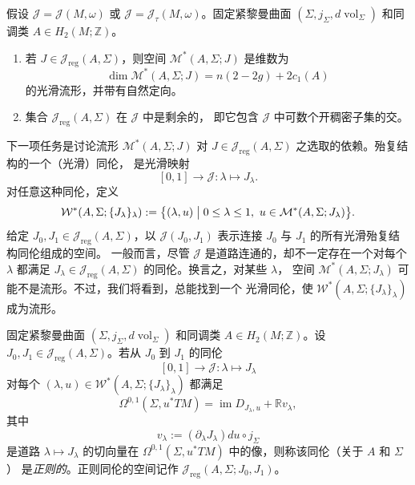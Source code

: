 \begin{theorem}\label{thm:3-1-6}
假设 $\mathcal J=\mathcal J(M,\omega)$ 或
$\mathcal J=\mathcal J_\tau(M,\omega)$。固定紧黎曼曲面
$(\Sigma,j_\Sigma,d\operatorname{vol}_\Sigma)$ 和同调类
$A\in H_2(M;\mathbb Z)$。
\begin{enumerate}[label=(\roman*),leftmargin=3em]
  \item 若 $J\in\mathcal J_{\mathrm{reg}}(A,\Sigma)$，则空间
  $\mathcal M^*(A,\Sigma;J)$ 是维数为
  \[
    \dim\mathcal M^*(A,\Sigma;J)
    =n(2-2g)+2c_1(A)
  \]
  的光滑流形，并带有自然定向。

  \item 集合 $\mathcal J_{\mathrm{reg}}(A,\Sigma)$ 在 $\mathcal J$ 中是剩余的，
  即它包含 $\mathcal J$ 中可数个开稠密子集的交。
\end{enumerate}
\end{theorem}

下一项任务是讨论流形 $\mathcal M^*(A,\Sigma;J)$ 对
$J\in\mathcal J_{\mathrm{reg}}(A,\Sigma)$ 之选取的依赖。殆复结构的一个（光滑）同伦，
是光滑映射
\[
  [0,1]\longrightarrow\mathcal J:
  \lambda\longmapsto J_\lambda.
\]
对任意这种同伦，定义
\[
  \mathcal W^*(A,\Sigma;\{J_\lambda\}_\lambda)
  :=\bigl\{(\lambda,u)\bigm|
  0\le\lambda\le1,\ u\in\mathcal M^*(A,\Sigma;J_\lambda)\bigr\}.
\]
给定 $J_0,J_1\in\mathcal J_{\mathrm{reg}}(A,\Sigma)$，以
$\mathcal J(J_0,J_1)$ 表示连接 $J_0$ 与 $J_1$ 的所有光滑殆复结构同伦组成的空间。
一般而言，尽管 $\mathcal J$ 是道路连通的，却不一定存在一个对每个 $\lambda$ 都满足
$J_\lambda\in\mathcal J_{\mathrm{reg}}(A,\Sigma)$ 的同伦。换言之，对某些 $\lambda$，
空间 $\mathcal M^*(A,\Sigma;J_\lambda)$ 可能不是流形。不过，我们将看到，总能找到一个
光滑同伦，使 $\mathcal W^*(A,\Sigma;\{J_\lambda\}_\lambda)$ 成为流形。

\begin{definition}\label{def:3-1-7}
固定紧黎曼曲面 $(\Sigma,j_\Sigma,d\operatorname{vol}_\Sigma)$ 和同调类
$A\in H_2(M;\mathbb Z)$。设
$J_0,J_1\in\mathcal J_{\mathrm{reg}}(A,\Sigma)$。若从 $J_0$ 到 $J_1$ 的同伦
\[
  [0,1]\longrightarrow\mathcal J:
  \lambda\longmapsto J_\lambda
\]
对每个 $(\lambda,u)\in\mathcal W^*(A,\Sigma;\{J_\lambda\}_\lambda)$ 都满足
\[
  \Omega^{0,1}(\Sigma,u^*TM)
  =\operatorname{im}D_{J_\lambda,u}+\mathbb Rv_\lambda,
\]
其中
\[
  v_\lambda:=(\partial_\lambda J_\lambda)du\circ j_\Sigma
\]
是道路 $\lambda\mapsto J_\lambda$ 的切向量在
$\Omega^{0,1}(\Sigma,u^*TM)$ 中的像，则称该同伦（关于 $A$ 和 $\Sigma$）
是\emph{正则的}。正则同伦的空间记作
$\mathcal J_{\mathrm{reg}}(A,\Sigma;J_0,J_1)$。
\end{definition}

